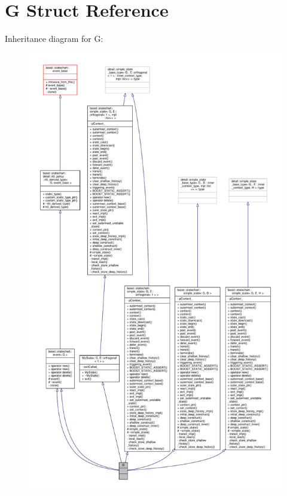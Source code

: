 \hypertarget{struct_g}{}\section{G Struct Reference}
\label{struct_g}


Inheritance diagram for G\+:
\nopagebreak
\begin{figure}[H]
\begin{center}
\leavevmode
\includegraphics[height=550pt]{struct_g__inherit__graph}
\end{center}
\end{figure}


